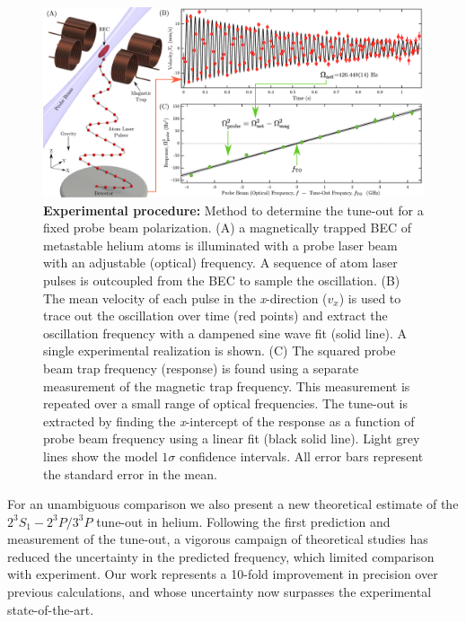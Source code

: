 \documentclass[aps,prl,
reprint,
superscriptaddress,
 amsmath,amssymb,
floatfix
]{revtex4-2}
\newcommand{\MetastableState}{2^{3\!}S_1}%
\newcommand{\UpperStateManifold}{3^{3\!}P}%
\newcommand{\LowerStateManifold}{2^{3\!}P}%
\newcommand{\TO}{\MetastableState- \LowerStateManifold / \UpperStateManifold}%
\begin{document}
\begin{figure}[t]
\centering
\includegraphics[width=1\textwidth]{figs/method_stage1and2_processing_schematic_v4.pdf}
\caption{
\textbf{Experimental procedure:} Method to determine the tune-out for a fixed probe beam polarization. (A) a magnetically trapped BEC of metastable helium atoms is illuminated with a probe laser beam with an adjustable (optical) frequency. A sequence of atom laser pulses is outcoupled from the BEC to sample the oscillation. (B) The mean velocity of each pulse in the \textit{x}-direction ($v_x$) is used to trace out the oscillation over time (red points) and extract the oscillation frequency with a dampened sine wave fit (solid line). A single experimental realization is shown. (C) The squared probe beam trap frequency (response) is found using a separate measurement of the magnetic trap frequency. This measurement is repeated over a small range of optical frequencies. The tune-out is extracted by finding the \textit{x}-intercept of the response as a function of probe beam frequency using a linear fit (black solid line). Light grey lines show the model \(1\sigma\) confidence intervals. All error bars represent the standard error in the mean.
}
\label{fig:stage_1_processing_schematic} 
\end{figure}


For an unambiguous comparison we also present a new theoretical estimate of the \(\TO\) tune-out in helium. Following the first prediction \cite{PhysRevA.88.052515} and measurement \cite{PhysRevLett.115.043004} of the tune-out, a vigorous campaign of theoretical studies \cite{PhysRevA.93.052516,manalo2017variational,Drake2019,PhysRevA.99.040502, PhysRevA.99.041803} has reduced the uncertainty in the predicted frequency, which limited comparison with experiment. Our work represents a 10-fold improvement in precision over previous calculations, and whose uncertainty now surpasses the experimental state-of-the-art.
\end{document}
